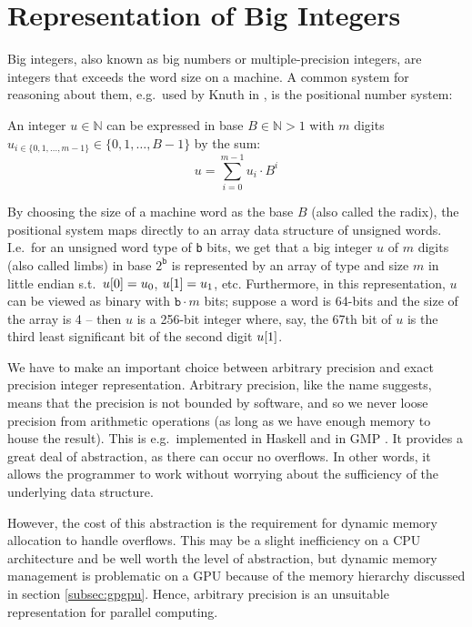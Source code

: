 \section{Representation of Big Integers}
\label{sec:big}
Big integers, also known as big numbers or multiple-precision integers, are
integers that exceeds the word size on a machine. A common system for reasoning
about them, e.g.\ used by Knuth in \cite{knuth97}, is the positional number
system:

\begin{definition}\label{def:bigints}
  An integer $u \in \mathbb{N}$ can be expressed in base $B \in \mathbb{N}>1$ with
  $m$ digits $u_{i\in \{0,1,\ldots,m-1\}}\in\{0,1,\ldots,B-1\}$ by the sum:
  \begin{equation}
\label{eq:rep}
u = \sum_{i=0}^{m-1}u_i\cdot B^{i}
\end{equation}
\end{definition}

By choosing the size of a machine word as the base $B$ (also called the radix),
the positional system maps directly to an array data structure of unsigned
words. I.e.\ for an unsigned word type \uint{} of \texttt{b} bits, we get that a
big integer $u$ of $m$ digits (also called limbs) in base $2^{\mathtt{b}}$ is
represented by an array of type \uint{} and size $m$ in little endian s.t.\
$u\mathtt{[}0\mathtt{]} = u_0$, $u\mathtt{[}1\mathtt{]} = u_1$, etc. Furthermore, in this
representation, $u$ can be viewed as binary with ${\mathtt{b}\cdot m}$ bits; suppose
a word is 64-bits and the size of the array is 4 -- then $u$ is a 256-bit integer
where, say, the 67th bit of $u$ is the third least significant bit of the second
digit $u\mathtt{[}1\mathtt{]}$.

We have to make an important choice between arbitrary precision and exact
precision integer representation. Arbitrary precision, like the name suggests,
means that the precision is not bounded by software, and so we never loose
precision from arithmetic operations (as long as we have enough memory to house
the result). This is e.g.\ implemented in Haskell and in GMP
\cite{marlow2010haskell,GMP}. It provides a great deal of abstraction, as there
can occur no overflows. In other words, it allows the programmer to work without
worrying about the sufficiency of the underlying data structure.

However, the cost of this abstraction is the requirement for dynamic memory
allocation to handle overflows. This may be a slight inefficiency on a CPU
architecture and be well worth the level of abstraction, but dynamic memory
management is problematic on a GPU because of the memory hierarchy discussed in
section \ref{subsec:gpgpu}. Hence, arbitrary precision is an unsuitable
representation for parallel computing.

